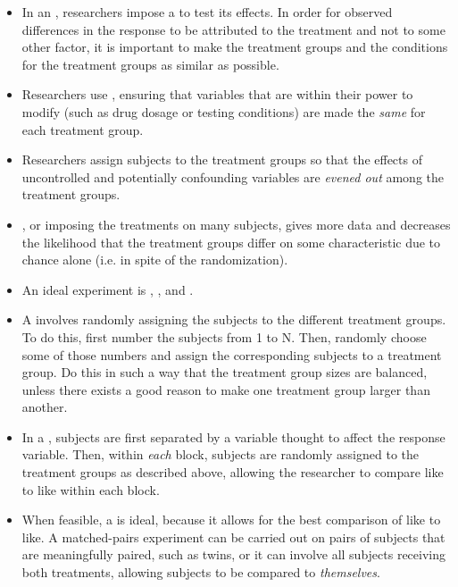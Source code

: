\begin{itemize}
\item In an , researchers impose a  to test its effects.  In order for observed differences in the response to be attributed to the treatment and not to some other factor, it is important to make the treatment groups and the conditions for the treatment groups as similar as possible.

\item Researchers use , ensuring that variables that are within their power to modify (such as drug dosage or testing conditions) are made the \textit{same} for each treatment group.  

\item Researchers  assign subjects to the treatment groups so that the effects of uncontrolled and potentially confounding variables are \textit{evened out} among the treatment groups.

\item {}, or imposing the treatments on many subjects, gives more data and decreases the likelihood that the treatment groups differ on some characteristic due to chance alone (i.e. in spite of the randomization).  

\item An ideal experiment is , , and .  

\item A  involves randomly assigning the subjects to the different treatment groups.  To do this, first number the subjects from 1 to N.  Then, randomly choose some of those numbers and assign the corresponding subjects to a treatment group.  Do this in such a way that the treatment group sizes are balanced, unless there exists a good reason to make one treatment group larger than another.

\item In a , subjects are first separated by a variable thought to affect the response variable.  Then, within \textit{each} block, subjects are randomly assigned to the treatment groups as described above, allowing the researcher to compare like to like within each block. 

\item When feasible, a  is ideal, because it allows for the best comparison of like to like.  A matched-pairs experiment can be carried out on pairs of subjects that are meaningfully paired, such as twins, or it can involve all subjects receiving both treatments, allowing subjects to be compared to \textit{themselves}.  


\end{itemize}
